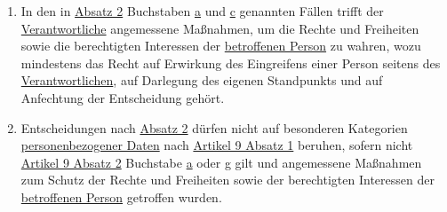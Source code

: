 \begin{enumerate}
\begin{enumerate}
  \end{enumerate}

  \item In den in \hyperref[itm:22-2]{Absatz 2} Buchstaben \hyperref[itm:22-2a]{a} und \hyperref[itm:22-2c]{c} genannten
   Fällen trifft der \hyperref[itm:04-7]{Verantwortliche} angemessene Maßnahmen, um die Rechte und Freiheiten sowie die
   berechtigten Interessen der \hyperref[itm:04-1]{betroffenen Person} zu wahren, wozu mindestens das Recht auf
   Erwirkung des Eingreifens einer Person seitens des \hyperref[itm:04-7]{Verantwortlichen}, auf Darlegung des eigenen
   Standpunkts und auf Anfechtung der Entscheidung gehört.%
  \label{itm:22-3}

  \item Entscheidungen nach \hyperref[itm:22-2]{Absatz 2} dürfen nicht auf besonderen Kategorien \hyperref[itm:04-1]
   {personenbezogener Daten} nach \hyperref[itm:09-1]{Artikel 9 Absatz 1} beruhen, sofern nicht \hyperref[itm:09-2]
   {Artikel 9 Absatz 2} Buchstabe
  \hyperref[itm:09-2a]{a} oder \hyperref[itm:09-2g]{g} gilt und angemessene Maßnahmen zum Schutz der Rechte und
   Freiheiten sowie der berechtigten Interessen der \hyperref[itm:04-1]{betroffenen Person} getroffen wurden.%
  \label{itm:22-4}

\end{enumerate}



